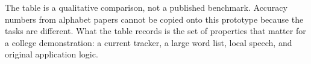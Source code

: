 The table is a qualitative comparison, not a published benchmark. Accuracy numbers from alphabet papers cannot be copied onto this prototype because the tasks are different. What the table records is the set of properties that matter for a college demonstration: a current tracker, a large word list, local speech, and original application logic.
